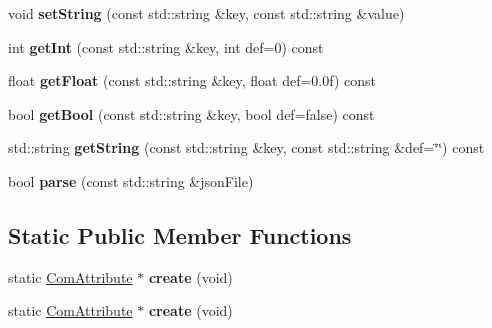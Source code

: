 \begin{DoxyCompactItemize}
\item 
\mbox{\label{classcocostudio_1_1ComAttribute_ac3b82d8c2c67dcbc913d6d5d40c4c239}} 
void {\bfseries set\+String} (const std\+::string \&key, const std\+::string \&value)
\item 
\mbox{\label{classcocostudio_1_1ComAttribute_a091c0900eac36cd4134d5611acb597c1}} 
int {\bfseries get\+Int} (const std\+::string \&key, int def=0) const
\item 
\mbox{\label{classcocostudio_1_1ComAttribute_a95d1d838dbb402b63f20ff203efeb62c}} 
float {\bfseries get\+Float} (const std\+::string \&key, float def=0.\+0f) const
\item 
\mbox{\label{classcocostudio_1_1ComAttribute_a6cc9cb29eb2471f4bf6db7876475f333}} 
bool {\bfseries get\+Bool} (const std\+::string \&key, bool def=false) const
\item 
\mbox{\label{classcocostudio_1_1ComAttribute_ac7c94828336181401bd65034d98b9314}} 
std\+::string {\bfseries get\+String} (const std\+::string \&key, const std\+::string \&def=\char`\"{}\char`\"{}) const
\item 
\mbox{\label{classcocostudio_1_1ComAttribute_a744870ce9078053ca58c940ad2836ad5}} 
bool {\bfseries parse} (const std\+::string \&json\+File)
\end{DoxyCompactItemize}
\subsection*{Static Public Member Functions}
\begin{DoxyCompactItemize}
\item 
\mbox{\label{classcocostudio_1_1ComAttribute_a2511264d11fb91cb5b318e155d2bca89}} 
static \hyperlink{classcocostudio_1_1ComAttribute}{Com\+Attribute} $\ast$ {\bfseries create} (void)
\item 
\mbox{\label{classcocostudio_1_1ComAttribute_ad6c33ffc7b0e1ea4868088faa726226b}} 
static \hyperlink{classcocostudio_1_1ComAttribute}{Com\+Attribute} $\ast$ {\bfseries create} (void)
\end{DoxyCompactItemize}
